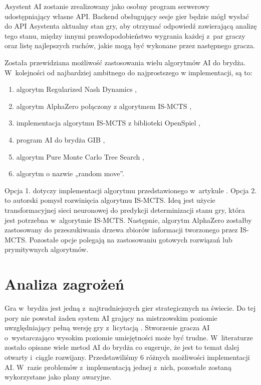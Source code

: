 Asystent AI zostanie zrealizowany jako osobny program serwerowy
udostępniający własne API. Backend obsługujący sesje gier
będzie mógł wysłać do API Asystenta aktualny stan gry, aby otrzymać
odpowiedź zawierającą analizę tego stanu, między innymi
prawdopodobieństwo wygrania każdej z~par graczy oraz listę
najlepszych ruchów, jakie mogą być wykonane przez następnego gracza.

Została przewidziana możliwość zastosowania wielu algorytmów AI
do brydża. W~kolejności od najbardziej ambitnego do
najprostszego w implementacji, są to:
\begin{enumerate}
  \item algorytm Regularized Nash Dynamics \cite{doi:10.1126/science.add4679},
  \item algorytm AlphaZero \cite{AlphaZeroPaper} połączony
        z algorytmem IS-MCTS \cite{6203567},
  \item implementacja algorytmu IS-MCTS z biblioteki OpenSpiel \cite{LanctotEtAl2019OpenSpiel},
  \item program AI do brydża GIB \cite{Ginsberg1999GIBST},
  \item algorytm Pure Monte Carlo Tree Search \cite{pmcts},
  \item algorytm o nazwie „random move”.
\end{enumerate}

Opcja 1. dotyczy implementacji algorytmu przedstawionego w~artykule
\cite{doi:10.1126/science.add4679}.
Opcja 2. to autorski pomysł rozwinięcia algorytmu IS-MCTS.
Ideą jest użycie transformacyjnej sieci neuronowej do predykcji
determinizacji stanu gry, która jest potrzebna w~algorytmie IS-MCTS.
Następnie, algorytm AlphaZero zostałby zastosowany do przeszukiwania
drzewa zbiorów informacji tworzonego przez IS-MCTS.
Pozostałe opcje polegają na zastosowaniu gotowych rozwiązań lub
prymitywnych algorytmów.


\section{Analiza zagrożeń}

Gra w~brydża jest jedną z~najtrudniejszych gier strategicznych na świecie.
Do tej pory nie powstał żaden system AI grający na mistrzowskim poziomie
uwzględniający pełną wersję gry z~licytacją \cite{Bethe2021AdvancesIC}.
Stworzenie gracza AI o~wystarczająco wysokim poziomie umiejętności może być
trudne. W~literaturze zostało opisane wiele metod AI do brydża
\cite{Zhang2019DesignAD,Zhang2022TheSO,Zhang2022AIEB,Ginsberg1999GIBST}
co sugeruje, że jest to temat dalej otwarty i~ciągle rozwijany.
Przedstawiliśmy 6 różnych możliwości implementacji AI.
W~razie problemów z~implementacją jednej z~nich, pozostałe
zostaną wykorzystane jako plany awaryjne.

